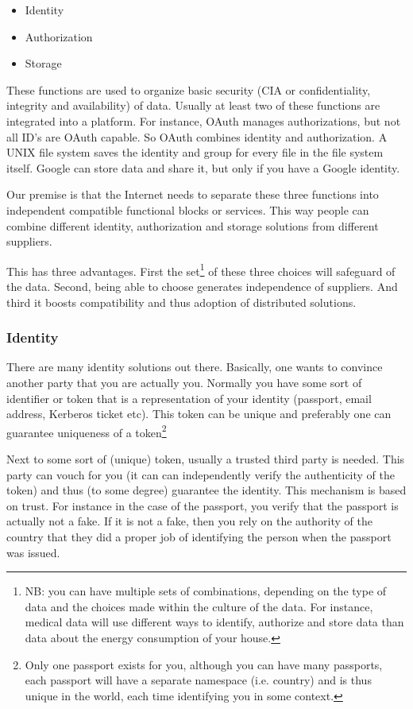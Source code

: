 \documentclass{article}
\begin{document}
\begin{itemize}
    \item Identity
    \item Authorization
    \item Storage
\end{itemize}

These functions are used to organize basic security (CIA or confidentiality, integrity and availability) of data. Usually at least two of these functions are integrated into a platform. For instance, OAuth manages authorizations, but not all ID's are OAuth capable. So OAuth combines identity and authorization. A UNIX file system saves the identity and group for every file in the file system itself. Google can store data and share it, but only if you have a Google identity. 

Our premise is that the Internet needs to separate these three functions into independent compatible functional blocks or services. This way people can combine different identity, authorization and storage solutions from different suppliers.

This has three advantages. First the set\footnote{NB: you can have multiple sets of combinations, depending on the type of data and the choices made within the culture of the data. For instance, medical data will use different ways to identify, authorize and store data than data about the energy consumption of your house.} of these three choices will safeguard of the data. Second, being able to choose generates independence of suppliers. And third it boosts compatibility and thus adoption of distributed solutions.

\subsubsection{Identity}
There are many identity solutions out there. Basically, one wants to convince another party that you are actually you. Normally you have some sort of identifier or token that is a representation of your identity (passport, email address, Kerberos ticket etc). This token can be unique and preferably one can guarantee uniqueness of a token\footnote{Only one passport exists for you, although you can have many passports, each passport will have a separate namespace (i.e. country) and is thus unique in the world, each time identifying you in some context.}

Next to some sort of (unique) token, usually a trusted third party is needed. This party can vouch for you (it can can independently verify the authenticity of the token) and thus (to some degree) guarantee the identity. This mechanism is based on trust. For instance in the case of the passport, you verify that the passport is actually not a fake. If it is not a fake, then you rely on the authority of the country that they did a proper job of identifying the person when the passport was issued.
\end{document}
